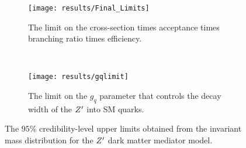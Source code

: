 \begin{figure}[htbp]
 \centering
 \begin{subfigure}[t]{0.5\textwidth}
  \centering
  \texttt{[image: results/Final\_Limits]}
  \caption{The limit on the cross-section times acceptance times branching ratio times efficiency.}
  \label{fig:cross_section_limits}
 \end{subfigure}%
 ~
 \begin{subfigure}[t]{0.5\textwidth}
  \centering
  \texttt{[image: results/gqlimit]}
  \caption{The limit on the $g_{q}$ parameter that controls the decay width of the $Z'$ into SM quarks.}
  \label{fig:gq_limits}
 \end{subfigure}
 \caption{The $95\%$ credibility-level upper limits obtained from the invariant mass distribution for the $Z'$ dark matter mediator model.}
 \label{fig:Zprime_limits}
\end{figure}
